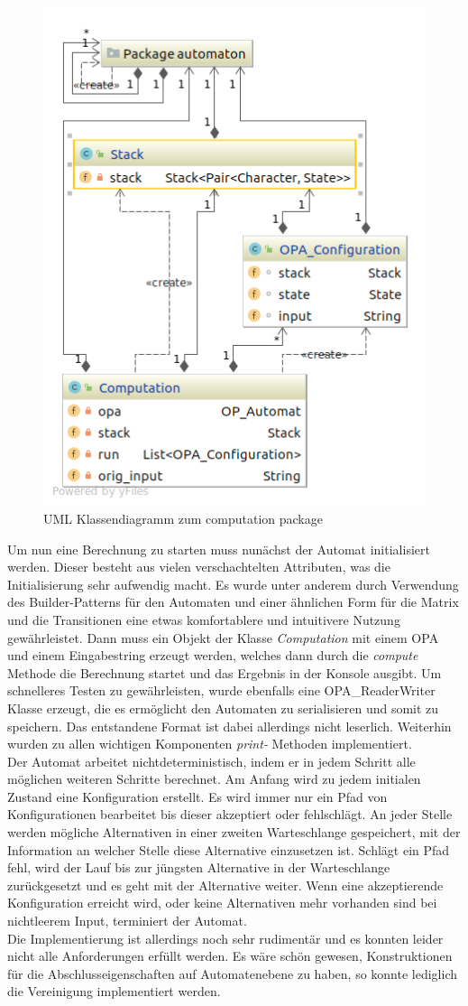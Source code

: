  \begin{figure}
 \centering
 \includegraphics[scale=0.35]{sections/computation}
 \caption{UML Klassendiagramm zum computation package}
 \end{figure}
Um nun eine Berechnung zu starten muss nunächst der Automat initialisiert werden. Dieser besteht aus vielen verschachtelten Attributen, was die Initialisierung sehr aufwendig macht. Es wurde unter anderem durch Verwendung des Builder-Patterns für den Automaten und einer ähnlichen Form für die Matrix und die Transitionen eine etwas komfortablere und intuitivere Nutzung gewährleistet. Dann muss ein Objekt der Klasse \textit{Computation} mit einem OPA und einem Eingabestring erzeugt werden, welches dann durch die \textit{compute} Methode die Berechnung startet und das Ergebnis in der Konsole ausgibt. Um schnelleres Testen zu gewährleisten, wurde ebenfalls eine OPA\_ReaderWriter Klasse erzeugt, die es ermöglicht den Automaten zu serialisieren und somit zu speichern. Das entstandene Format ist dabei allerdings nicht leserlich. Weiterhin wurden zu allen wichtigen Komponenten \textit{print-} Methoden implementiert.\\
Der Automat arbeitet nichtdeterministisch, indem er in jedem Schritt alle möglichen weiteren Schritte berechnet. Am Anfang wird zu jedem initialen Zustand eine Konfiguration erstellt. Es wird immer nur ein Pfad von Konfigurationen bearbeitet bis dieser akzeptiert oder fehlschlägt. An jeder Stelle werden mögliche Alternativen in einer zweiten Warteschlange gespeichert, mit der Information an welcher Stelle diese Alternative einzusetzen ist. Schlägt ein Pfad fehl, wird der Lauf bis zur jüngsten Alternative in der Warteschlange zurückgesetzt und es geht mit der Alternative weiter. Wenn eine akzeptierende Konfiguration erreicht wird, oder keine Alternativen mehr vorhanden sind bei nichtleerem Input, terminiert der Automat. \\
Die Implementierung ist allerdings noch sehr rudimentär und es konnten leider nicht alle Anforderungen erfüllt werden. Es wäre schön gewesen, Konstruktionen für die Abschlusseigenschaften auf Automatenebene zu haben, so konnte lediglich die Vereinigung implementiert werden.